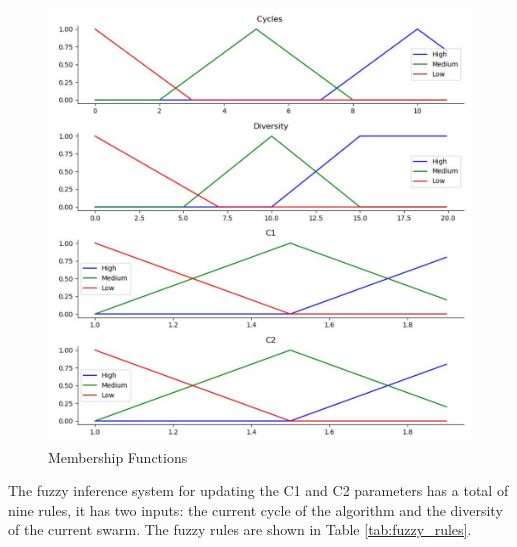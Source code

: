 \documentclass[graybox]{svmult}
\begin{document}
\begin{figure} [htbp]
  \centering
  \includegraphics[angle=0,width=1\textwidth]{Figure_1.pdf}
  \caption{Membership Functions}
  \label{fig:member} 
\end{figure}

The fuzzy inference system for updating the C1 and C2 parameters has a  total of nine rules, it has two inputs: the current cycle of the algorithm and the diversity of the current swarm. The fuzzy rules are shown in Table \ref{tab:fuzzy_rules}. 
\end{document}
